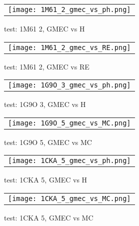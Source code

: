     \clearpage
    
    \begin{figure}[h]
      \centering
      \begin{tabular}{c} 
        \texttt{[image: 1M61\_2\_gmec\_vs\_ph.png]} 
      \end{tabular}
      
      \caption{test: 1M61 2, GMEC vs H}
\label{image:1M61_2_GMEC_vs_H}
    \end{figure}
    
        
    \begin{figure}[h]
      \centering
      \begin{tabular}{c} 
        \texttt{[image: 1M61\_2\_gmec\_vs\_RE.png]} 
      \end{tabular}
      
      \caption{test: 1M61 2, GMEC vs RE}
\label{image:1M61_2_GMEC_vs_RE}
    \end{figure}
    
        
    \begin{figure}[h]
      \centering
      \begin{tabular}{c} 
        \texttt{[image: 1G9O\_3\_gmec\_vs\_ph.png]} 
      \end{tabular}
      
      \caption{test: 1G9O 3, GMEC vs H}
\label{image:1G9O_3_GMEC_vs_H}
    \end{figure}
    
    
    \begin{figure}[h]
      \centering
      \begin{tabular}{c} 
        \texttt{[image: 1G9O\_5\_gmec\_vs\_MC.png]} 
      \end{tabular}
      
      \caption{test: 1G9O 5, GMEC vs MC}
\label{image:1G9O_5_GMEC_vs_MC}
    \end{figure}
    
    \begin{figure}[h]
      \centering
      \begin{tabular}{c} 
        \texttt{[image: 1CKA\_5\_gmec\_vs\_ph.png]} 
      \end{tabular}
      
      \caption{test: 1CKA 5, GMEC vs H}
\label{image:1CKA_5_GMEC_vs_H}
    \end{figure}

    \begin{figure}[h]
      \centering
      \begin{tabular}{c} 
        \texttt{[image: 1CKA\_5\_gmec\_vs\_MC.png]} 
      \end{tabular}
      
      \caption{test: 1CKA 5, GMEC vs MC}
\label{image:1CKA_5_GMEC_vs_MC}
    \end{figure}
    

